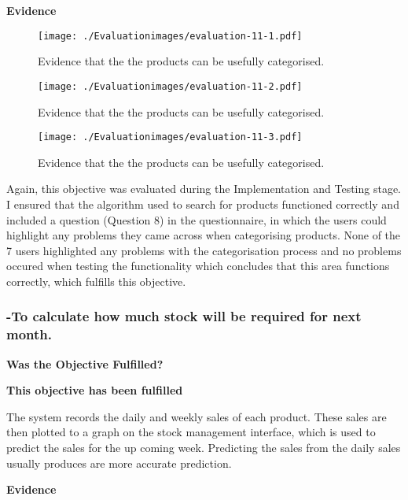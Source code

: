 \textbf{Evidence} \newline
\label{category-evidence}

\begin{figure}[H]
\caption{Evidence that the the products can be usefully categorised.} \label{fig:evaluation-11-1}
\hfill\texttt{[image: ./Evaluationimages/evaluation-11-1.pdf]}
\end{figure}

\begin{figure}[H]
\caption{Evidence that the the products can be usefully categorised.} \label{fig:evaluation-11-2}
\hfill\texttt{[image: ./Evaluationimages/evaluation-11-2.pdf]}
\end{figure}

\begin{figure}[H]
\caption{Evidence that the the products can be usefully categorised.} \label{fig:evaluation-11-3}
\hfill\texttt{[image: ./Evaluationimages/evaluation-11-3.pdf]}
\end{figure}

Again, this objective was evaluated during the Implementation and Testing stage. I ensured that the algorithm used to search for products functioned correctly and included a question (Question 8) in the questionnaire, in which the users could highlight any problems they came across when categorising products. None of the 7 users highlighted any problems with the categorisation process and no problems occured when testing the functionality which concludes that this area functions correctly, which fulfills this objective.




\pagebreak
\subsubsection{-To calculate how much stock will be required for next month.}
\label{stock-eval}
\textbf{Was the Objective Fulfilled?} \newline

\textbf{\large{This objective has been fulfilled}}


The system records the daily and weekly sales of each product. These sales are then plotted to a graph on the stock management interface, which is used to predict the sales for the up coming week. Predicting the sales from the daily sales usually produces are more accurate prediction.

\textbf{Evidence} \newline

